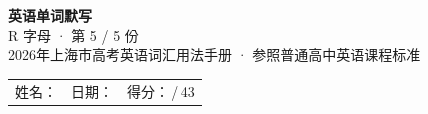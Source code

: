 \documentclass[10pt,a4paper]{article}
\begin{document}
\pagestyle{plain}

\begin{center}
{\LARGE\bfseries 英语单词默写}\\[0.22em]
{\large R 字母 · 第 5 / 5 份}\\[0.18em]
{\small 2026年上海市高考英语词汇用法手册 · 参照普通高中英语课程标准}
\end{center}

\vspace{0.25em}
\noindent\begin{tabular}{@{}p{}@{}p{}@{}p{}@{}}
姓名：\underline{\hspace{2.0cm}} & 日期：\underline{\hspace{2.0cm}} & 得分：\underline{\hspace{1.3cm}}\,/\,43 \\
\end{tabular}

\vspace{0.3em}

\vspace{0.08em}
\end{document}
